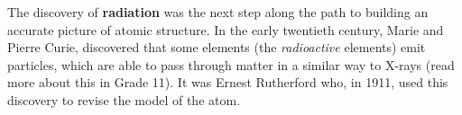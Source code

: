 \par
        \label{m38756*id254642}The discovery of \textbf{radiation} was the next step along the path to building an accurate picture of atomic structure. In the early twentieth century, Marie and Pierre Curie, discovered that some elements (the \textsl{radioactive} elements) emit particles, which are able to pass through matter in a similar way to X-rays (read more about this in Grade 11). It was Ernest Rutherford who, in 1911, used this discovery to revise the model of the atom.\par 
      \label{m38756*eip-956}
      \label{m38756*uid3}
